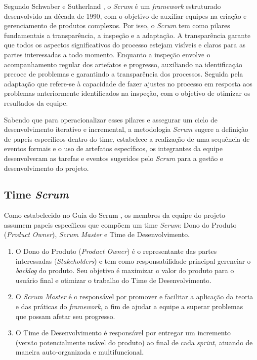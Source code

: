 \documentclass[
	12pt,				%
	openany,			%
	twoside,			%
	a4paper,			%
	english,			%
	french,				%
	spanish,			%
	brazil				%
	]{abntex2}
\begin{document}
Segundo Schwaber e Sutherland \cite{scrumguide}, o \textit{Scrum} é um \textit{framework} estruturado desenvolvido na década de 1990, com o objetivo de auxiliar equipes na criação e gerenciamento de produtos complexos. Por isso,  o \textit{Scrum} tem como pilares fundamentais a transparência, a inspeção e a adaptação. A transparência garante que todos os aspectos significativos do processo estejam visíveis e claros para as partes interessadas a todo momento. Enquanto a inspeção envolve o acompanhamento regular dos artefatos e progresso, auxiliando na identificação precoce de problemas e garantindo a transparência dos processos. Seguida pela adaptação que refere-se à capacidade de fazer ajustes no processo  em resposta aos problemas anteriormente identificados na inspeção, com o objetivo de otimizar os resultados da equipe.

Sabendo que para operacionalizar esses pilares e assegurar um ciclo de desenvolvimento iterativo e incremental, a metodologia \textit{Scrum} sugere a definição de papeis específicos dentro do time, estabelece a realização de uma sequência de eventos formais e o uso de artefatos específicos, os integrantes da equipe desenvolveram as tarefas e eventos sugeridos pelo \textit{Scrum} para a gestão e desenvolvimento do projeto.

\subsection{Time \textit{Scrum}}
Como estabelecido no Guia do Scrum \cite{scrumguide}, os membros da equipe do projeto assumem papeis específicos que compõem um time \textit{Scrum}: Dono do Produto (\textit{Product Owner}), \textit{Scrum Master} e Time de Desenvolvimento. 

\begin{enumerate}[label=\roman*)]
	\item O Dono do Produto (\textit{Product Owner}) é o representante das partes interessadas (\textit{Stakeholders}) e tem como responsabilidade principal gerenciar o \textit{backlog} do produto. Seu objetivo é maximizar o valor do produto para o usuário final e otimizar o trabalho do Time de Desenvolvimento. 
	\item O \textit{Scrum Master}  é o responsável por promover e facilitar a aplicação da teoria e das práticas do \textit{framework}, a fim de ajudar a equipe a superar problemas que possam afetar seu progresso. 
	\item O Time de Desenvolvimento é responsável por entregar um incremento (versão potencialmente usável do produto) ao final de cada \textit{sprint}, atuando de maneira auto-organizada e multifuncional.
\end{enumerate}
 
\end{document}
